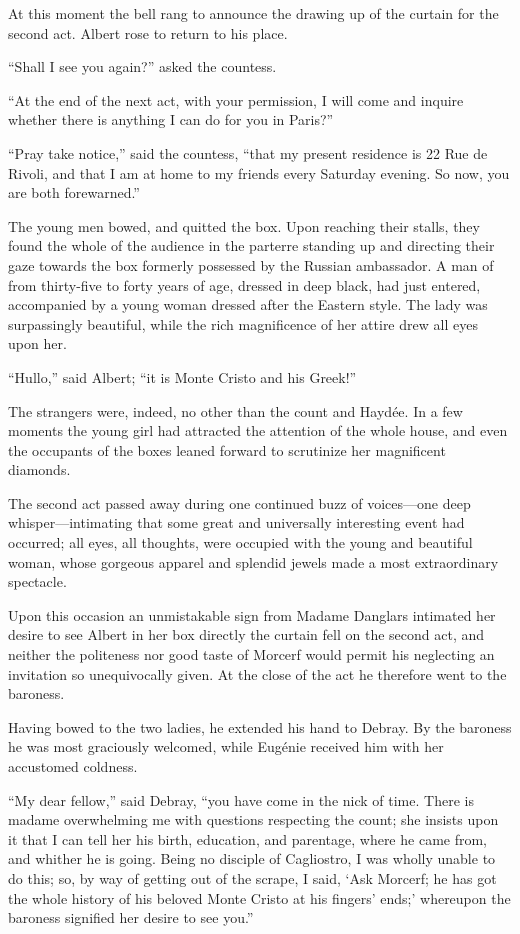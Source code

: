 At this moment the bell rang to announce the drawing up of the curtain
for the second act. Albert rose to return to his place.

“Shall I see you again?” asked the countess.

“At the end of the next act, with your permission, I will come and
inquire whether there is anything I can do for you in Paris?”

“Pray take notice,” said the countess, “that my present residence is 22
Rue de Rivoli, and that I am at home to my friends every Saturday
evening. So now, you are both forewarned.”

The young men bowed, and quitted the box. Upon reaching their stalls,
they found the whole of the audience in the parterre standing up and
directing their gaze towards the box formerly possessed by the Russian
ambassador. A man of from thirty-five to forty years of age, dressed in
deep black, had just entered, accompanied by a young woman dressed
after the Eastern style. The lady was surpassingly beautiful, while the
rich magnificence of her attire drew all eyes upon her.

“Hullo,” said Albert; “it is Monte Cristo and his Greek!”

The strangers were, indeed, no other than the count and Haydée. In a
few moments the young girl had attracted the attention of the whole
house, and even the occupants of the boxes leaned forward to scrutinize
her magnificent diamonds.

The second act passed away during one continued buzz of voices—one deep
whisper—intimating that some great and universally interesting event
had occurred; all eyes, all thoughts, were occupied with the young and
beautiful woman, whose gorgeous apparel and splendid jewels made a most
extraordinary spectacle.

Upon this occasion an unmistakable sign from Madame Danglars intimated
her desire to see Albert in her box directly the curtain fell on the
second act, and neither the politeness nor good taste of Morcerf would
permit his neglecting an invitation so unequivocally given. At the
close of the act he therefore went to the baroness.

Having bowed to the two ladies, he extended his hand to Debray. By the
baroness he was most graciously welcomed, while Eugénie received him
with her accustomed coldness.

“My dear fellow,” said Debray, “you have come in the nick of time.
There is madame overwhelming me with questions respecting the count;
she insists upon it that I can tell her his birth, education, and
parentage, where he came from, and whither he is going. Being no
disciple of Cagliostro, I was wholly unable to do this; so, by way of
getting out of the scrape, I said, ‘Ask Morcerf; he has got the whole
history of his beloved Monte Cristo at his fingers’ ends;’ whereupon
the baroness signified her desire to see you.”

